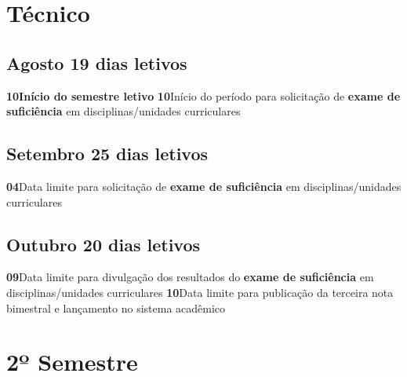 \documentclass[thesis]{hmcposter}
\begin{document}
\begin{poster}
\section{\color{hmcorange}Técnico}\subsection{Agosto \hfill 19 dias letivos}\textbf{10}\qquad \textbf{Início do semestre letivo} \newline \null\textbf{10}\qquad Início do período para solicitação de \textbf{exame de suficiência} em disciplinas/unidades curriculares \newline \null\subsection{Setembro \hfill 25 dias letivos}\textbf{04}\qquad Data limite para solicitação de \textbf{exame de suficiência} em disciplinas/unidades curriculares \newline \null\subsection{Outubro \hfill 20 dias letivos}\textbf{09}\qquad Data limite para divulgação dos resultados do \textbf{exame de suficiência} em disciplinas/unidades curriculares \newline \null\textbf{10}\qquad Data limite para publicação da terceira nota bimestral e lançamento no sistema acadêmico  \newline \null\vfill\null
\columnbreak
\section{\hfill \color{hmcorange}2º Semestre}

\end{poster}
\end{document}
